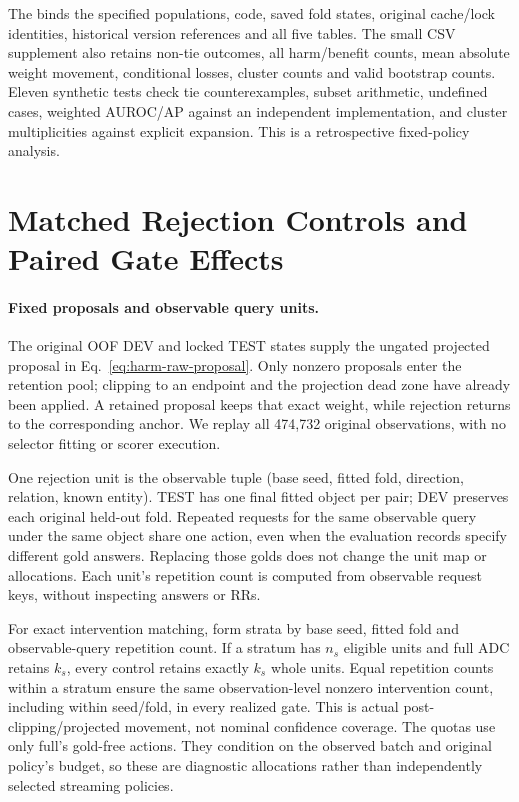 \documentclass[11pt,a4paper]{article}
\begin{document}
The  binds the specified populations, code, saved fold states, original cache/lock identities, historical version references and all five tables. The small CSV supplement also retains non-tie outcomes, all harm/benefit counts, mean absolute weight movement, conditional losses, cluster counts and valid bootstrap counts. Eleven synthetic tests check tie counterexamples, subset arithmetic, undefined cases, weighted AUROC/AP against an independent implementation, and cluster multiplicities against explicit expansion. This is a retrospective fixed-policy analysis.
\FloatBarrier

\section{Matched Rejection Controls and Paired Gate Effects}
\label{app:rejection}

\paragraph{Fixed proposals and observable query units.}
The original OOF DEV and locked TEST states supply the ungated projected proposal in Eq.~\eqref{eq:harm-raw-proposal}. Only nonzero proposals enter the retention pool; clipping to an endpoint and the projection dead zone have already been applied. A retained proposal keeps that exact weight, while rejection returns to the corresponding anchor. We replay all 474,732 original observations, with no selector fitting or scorer execution.

One rejection unit is the observable tuple (base seed, fitted fold, direction, relation, known entity). TEST has one final fitted object per pair; DEV preserves each original held-out fold. Repeated requests for the same observable query under the same object share one action, even when the evaluation records specify different gold answers. Replacing those golds does not change the unit map or allocations. Each unit's repetition count is computed from observable request keys, without inspecting answers or RRs.

For exact intervention matching, form strata by base seed, fitted fold and observable-query repetition count. If a stratum has $n_s$ eligible units and full ADC retains $k_s$, every control retains exactly $k_s$ whole units. Equal repetition counts within a stratum ensure the same observation-level nonzero intervention count, including within seed/fold, in every realized gate. This is actual post-clipping/projected movement, not nominal confidence coverage. The quotas use only full's gold-free actions. They condition on the observed batch and original policy's budget, so these are diagnostic allocations rather than independently selected streaming policies.
\end{document}
